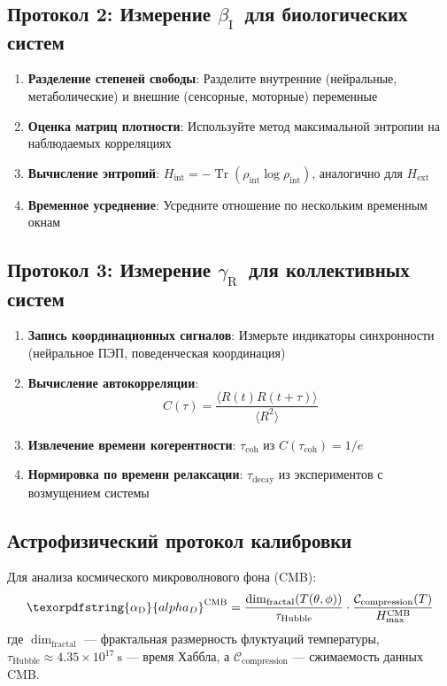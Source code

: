 \documentclass[12pt,a4paper]{article}
\DeclareMathOperator{\Tr}{Tr}
\DeclareRobustCommand{\alD}{\texorpdfstring{\ensuremath{\alpha_{\mathrm{D}}}}{alpha_D}}
\DeclareRobustCommand{\beI}{\texorpdfstring{\ensuremath{\beta_{\mathrm{I}}}}{beta_I}}
\DeclareRobustCommand{\gaR}{\texorpdfstring{\ensuremath{\gamma_{\mathrm{R}}}}{gamma_R}}
\begin{document}
	\subsection{Протокол 2: Измерение \beI\ для биологических систем}
	
	\begin{enumerate}
		\item \textbf{Разделение степеней свободы}: Разделите внутренние (нейральные, метаболические) и внешние (сенсорные, моторные) переменные
		\item \textbf{Оценка матриц плотности}: Используйте метод максимальной энтропии на наблюдаемых корреляциях
		\item \textbf{Вычисление энтропий}: \(H_{\mathrm{int}} = -\Tr(\rho_{\mathrm{int}}\log\rho_{\mathrm{int}})\), аналогично для \(H_{\mathrm{ext}}\)
		\item \textbf{Временное усреднение}: Усредните отношение по нескольким временным окнам
	\end{enumerate}
	
	\subsection{Протокол 3: Измерение \gaR\ для коллективных систем}
	
	\begin{enumerate}
		\item \textbf{Запись координационных сигналов}: Измерьте индикаторы синхронности (нейральное ПЭП, поведенческая координация)
		\item \textbf{Вычисление автокорреляции}:
		\[
		C(\tau) = \frac{\langle R(t)R(t+\tau)\rangle}{\langle R^2\rangle}
		\]
		\item \textbf{Извлечение времени когерентности}: \(\tau_{\mathrm{coh}}\) из \(C(\tau_{\mathrm{coh}}) = 1/e\)
		\item \textbf{Нормировка по времени релаксации}: \(\tau_{\mathrm{decay}}\) из экспериментов с возмущением системы
	\end{enumerate}
	
	\subsection{Астрофизический протокол калибровки}
	\label{subsec:astro-calibration}
	
	Для анализа космического микроволнового фона (CMB):
	\[
	\alD^{\mathrm{CMB}} = \frac{\dim_{\mathrm{fractal}}(T(\theta,\phi))}{\tau_{\mathrm{Hubble}}} \cdot \frac{\mathcal{C}_{\mathrm{compression}}(T)}{H_{\max}^{\mathrm{CMB}}}
	\]
	где \(\dim_{\mathrm{fractal}}\) — фрактальная размерность флуктуаций температуры, \(\tau_{\mathrm{Hubble}} \approx 4.35 \times 10^{17}\ \mathrm{s}\) — время Хаббла, а \(\mathcal{C}_{\mathrm{compression}}\) — сжимаемость данных CMB.
	
\end{document}
